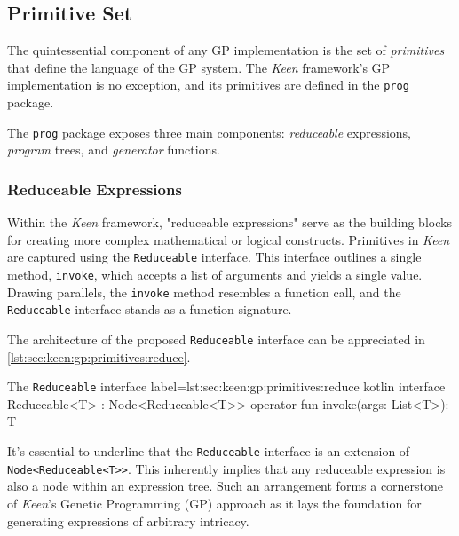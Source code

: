 
\subsection{Primitive Set}
\label{sec:keen:gp:primitives}
  The quintessential component of any GP implementation is the set of
  \textit{primitives} that define the language of the GP system. The
  \textit{Keen} framework's GP implementation is no exception, and its
  primitives are defined in the \texttt{prog} package.

  The \texttt{prog} package exposes three main components: \emph{reduceable}
  expressions, \emph{program} trees, and \emph{generator} functions.

  \subsubsection{Reduceable Expressions}
    Within the \textit{Keen} framework, "reduceable expressions" serve as the 
    building blocks for creating more complex mathematical or logical 
    constructs. Primitives in \textit{Keen} are captured using the 
    \texttt{Reduceable} interface. This interface outlines a single method, 
    \texttt{invoke}, which accepts a list of arguments and yields a single 
    value. Drawing parallels, the \texttt{invoke} method resembles a function 
    call, and the \texttt{Reduceable} interface stands as a function signature.
  
    The architecture of the proposed \texttt{Reduceable} interface can be 
    appreciated in \vref{lst:sec:keen:gp:primitives:reduce}.

    \begin{code}{
      The \texttt{Reduceable} interface
    }{
      label=lst:sec:keen:gp:primitives:reduce
    }{kotlin}
      interface Reduceable<T> : Node<Reduceable<T>> {
          operator fun invoke(args: List<T>): T
      }      
    \end{code}

    It's essential to underline that the \texttt{Reduceable} interface is an 
    extension of \texttt{Node<Reduceable<T>>}. This inherently implies that any 
    reduceable expression is also a node within an expression tree. Such an 
    arrangement forms a cornerstone of \textit{Keen}'s Genetic Programming (GP) 
    approach as it lays the foundation for generating expressions of arbitrary 
    intricacy.

